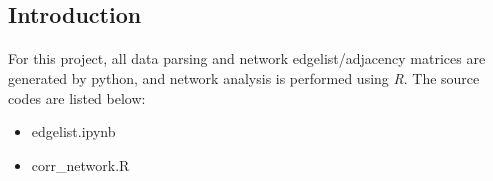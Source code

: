 \subsection*{Introduction}
\paragraph{}
For this project, all data parsing and network edgelist/adjacency matrices are generated by python, and network analysis is performed using \textit{R}. The source codes are listed below:
\begin{itemize}
	\item edgelist.ipynb
	\item corr\_network.R
\end{itemize}